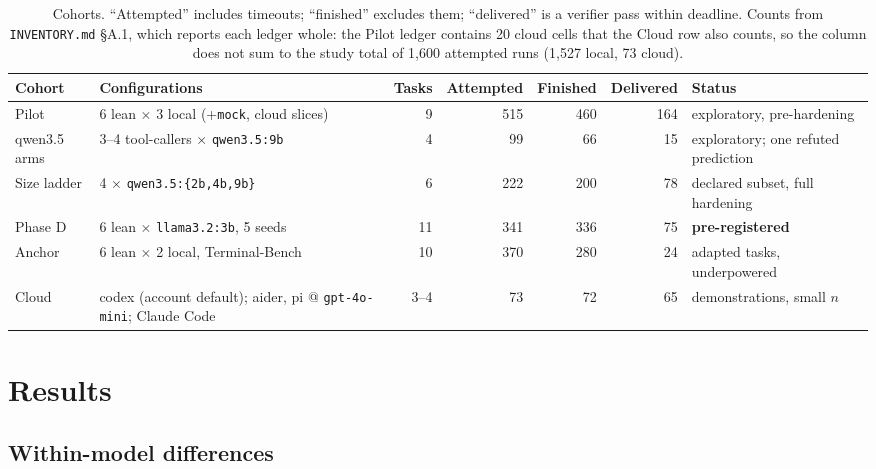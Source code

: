 \documentclass[10pt]{article}
\begin{document}
\begin{table}[t]
\centering\footnotesize
\setlength{\tabcolsep}{4pt}
\begin{tabular}{lp{5.2cm}rrrrp{3.6cm}}
\toprule
Cohort & Configurations & Tasks & Attempted & Finished & Delivered & Status\\
\midrule
Pilot & 6 lean $\times$ 3 local (+\texttt{mock}, cloud slices) & 9 & 515 & 460 & 164 & exploratory, pre-hardening\\
qwen3.5 arms & 3--4 tool-callers $\times$ \texttt{qwen3.5:9b} & 4 & 99 & 66 & 15 & exploratory; one refuted prediction\\
Size ladder & 4 $\times$ \texttt{qwen3.5:\{2b,4b,9b\}} & 6 & 222 & 200 & 78 & declared subset, full hardening\\
Phase D & 6 lean $\times$ \texttt{llama3.2:3b}, 5 seeds & 11 & 341 & 336 & 75 & \textbf{pre-registered}\\
Anchor & 6 lean $\times$ 2 local, Terminal-Bench & 10 & 370 & 280 & 24 & adapted tasks, underpowered\\
\midrule
Cloud & codex (account default); aider, pi @ \texttt{gpt-4o-mini}; Claude Code & 3--4 & 73 & 72 & 65 & demonstrations, small $n$\\
\bottomrule
\end{tabular}
\caption{Cohorts. ``Attempted'' includes timeouts; ``finished'' excludes them; ``delivered'' is a
verifier pass within deadline. Counts from \texttt{INVENTORY.md} \S A.1, which reports each ledger
whole: the Pilot ledger contains 20 cloud cells that the Cloud row also counts, so the column does
not sum to the study total of 1{,}600 attempted runs (1{,}527 local, 73 cloud).}
\label{tab:cohorts}
\end{table}

\section{Results}
\label{sec:results}

\subsection{Within-model differences}
\label{sec:within}
\end{document}
